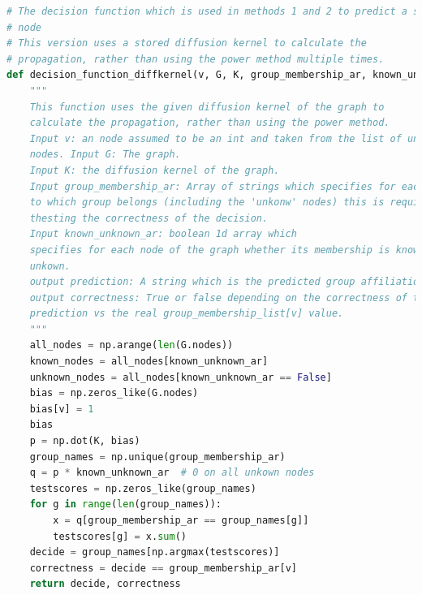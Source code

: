 \begin{lstlisting}[language=python]
# The decision function which is used in methods 1 and 2 to predict a single
# node
# This version uses a stored diffusion kernel to calculate the
# propagation, rather than using the power method multiple times.
def decision_function_diffkernel(v, G, K, group_membership_ar, known_unknown_ar):
    """
    This function uses the given diffusion kernel of the graph to
    calculate the propagation, rather than using the power method.
    Input v: an node assumed to be an int and taken from the list of unkown
    nodes. Input G: The graph.
    Input K: the diffusion kernel of the graph.
    Input group_membership_ar: Array of strings which specifies for each node
    to which group belongs (including the 'unkonw' nodes) this is required for
    thesting the correctness of the decision.
    Input known_unknown_ar: boolean 1d array which
    specifies for each node of the graph whether its membership is known or
    unkown.
    output prediction: A string which is the predicted group affiliation.
    output correctness: True or false depending on the correctness of the
    prediction vs the real group_membership_list[v] value.
    """
    all_nodes = np.arange(len(G.nodes))
    known_nodes = all_nodes[known_unknown_ar]
    unknown_nodes = all_nodes[known_unknown_ar == False]
    bias = np.zeros_like(G.nodes)
    bias[v] = 1
    bias
    p = np.dot(K, bias)
    group_names = np.unique(group_membership_ar)
    q = p * known_unknown_ar  # 0 on all unkown nodes
    testscores = np.zeros_like(group_names)
    for g in range(len(group_names)):
        x = q[group_membership_ar == group_names[g]]
        testscores[g] = x.sum()
    decide = group_names[np.argmax(testscores)]
    correctness = decide == group_membership_ar[v]
    return decide, correctness


\end{lstlisting}
